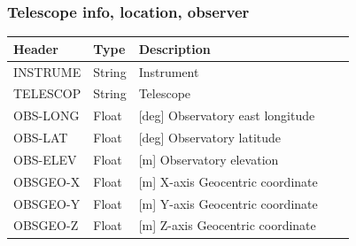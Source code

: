 \subsubsection{Telescope info, location, observer}
\begin{tabular}{l l l l l}

\hline
Header & Type & Description \\
\hline
INSTRUME & String & Instrument \\
TELESCOP & String & Telescope \\
OBS-LONG & Float & [deg] Observatory east longitude \\
OBS-LAT & Float & [deg] Observatory latitude \\
OBS-ELEV & Float & [m] Observatory elevation \\
OBSGEO-X & Float & [m] X-axis Geocentric coordinate \\
OBSGEO-Y & Float & [m] Y-axis Geocentric coordinate \\
OBSGEO-Z & Float & [m] Z-axis Geocentric coordinate \\
\hline
\end{tabular}


